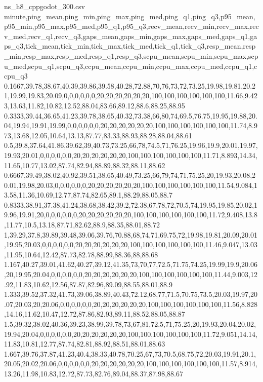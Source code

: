 \begin{filecontents*}[overwrite]{ns_h8_cppgodot_300.csv}
minute,ping_mean,ping_min,ping_max,ping_med,ping_q1,ping_q3,p95_mean,p95_min,p95_max,p95_med,p95_q1,p95_q3,recv_mean,recv_min,recv_max,recv_med,recv_q1,recv_q3,gaps_mean,gaps_min,gaps_max,gaps_med,gaps_q1,gaps_q3,tick_mean,tick_min,tick_max,tick_med,tick_q1,tick_q3,resp_mean,resp_min,resp_max,resp_med,resp_q1,resp_q3,scpu_mean,scpu_min,scpu_max,scpu_med,scpu_q1,scpu_q3,ccpu_mean,ccpu_min,ccpu_max,ccpu_med,ccpu_q1,ccpu_q3
0.1667,39.78,38.67,40.39,39.86,39.58,40.28,72.88,70,76,73,72,73.25,19.98,19.81,20.21,19.99,19.83,20.09,0,0,0,0,0,0,20,20,20,20,20,20,100,100,100,100,100,100,11.66,9.423,13.63,11.82,10.82,12.52,88.04,83.66,89.12,88.6,88.25,88.95
0.3333,39.44,36.65,41.23,39.78,38.65,40.32,73.38,66,80,74,69.5,76.75,19.95,19.88,20.04,19.94,19.91,19.99,0,0,0,0,0,0,20,20,20,20,20,20,100,100,100,100,100,100,11.74,8.973,13.68,12.05,10.64,13.13,87.77,83.33,88.93,88.28,88.04,88.61
0.5,39.8,37.64,41.86,39.62,39,40.73,73.25,66,78,74.5,71,76.25,19.96,19.9,20.01,19.97,19.93,20.01,0,0,0,0,0,0,20,20,20,20,20,20,100,100,100,100,100,100,11.71,8.893,14.34,11.65,10.77,13.02,87.74,82.94,88.89,88.32,88.11,88.62
0.6667,39.49,38.02,40.92,39.51,38.65,40.49,73.25,66,79,74,71,75.25,20,19.93,20.08,20.01,19.98,20.03,0,0,0,0,0,0,20,20,20,20,20,20,100,100,100,100,100,100,11.54,9.084,13.58,11.36,10.69,12.77,87.74,82.65,89.1,88.29,88.05,88.7
0.8333,38.91,37.38,41.24,38.68,38.42,39.2,72.38,67,78,72,70.5,74,19.95,19.85,20.02,19.96,19.91,20,0,0,0,0,0,0,20,20,20,20,20,20,100,100,100,100,100,100,11.72,9.408,13.8,11.77,10.5,13.18,87.71,82.62,88.9,88.35,88.01,88.72
1,39.29,37.8,39.89,39.48,39.06,39.76,70.88,68,74,71,69.75,72,19.98,19.81,20.09,20.01,19.95,20.03,0,0,0,0,0,0,20,20,20,20,20,20,100,100,100,100,100,100,11.46,9.047,13.03,11.95,10.64,12.42,87.73,82.78,88.99,88.36,88,88.68
1.167,40.27,39.01,41.62,40.27,39.12,41.35,73,70,77,72.5,71.75,74.25,19.99,19.9,20.06,20,19.95,20.04,0,0,0,0,0,0,20,20,20,20,20,20,100,100,100,100,100,100,11.44,9.003,12.92,11.83,10.62,12.56,87.87,82.96,89.09,88.55,88.01,88.9
1.333,39.52,37.32,41.73,39.06,38.89,40.43,72.12,68,77,71.5,70.75,73.5,20.03,19.97,20.07,20.03,20,20.06,0,0,0,0,0,0,20,20,20,20,20,20,100,100,100,100,100,100,11.56,8.828,14.16,11.62,10.47,12.72,87.86,82.93,89.11,88.52,88.05,88.87
1.5,39.32,38.02,40.36,39.23,38.99,39.78,73,67,81,72.5,71,75.25,20,19.93,20.04,20.02,19.94,20.04,0,0,0,0,0,0,20,20,20,20,20,20,100,100,100,100,100,100,11.72,9.051,14.14,11.83,10.81,12.77,87.74,82.81,88.92,88.51,88.01,88.63
1.667,39.76,37.87,41.23,40.4,38.33,40.78,70.25,67,73,70.5,68.75,72,20.03,19.91,20.1,20.05,20.02,20.06,0,0,0,0,0,0,20,20,20,20,20,20,100,100,100,100,100,100,11.57,8.914,13.26,11.98,10.83,12.72,87.73,82.76,89.04,88.37,87.98,88.67

\end{filecontents*}
